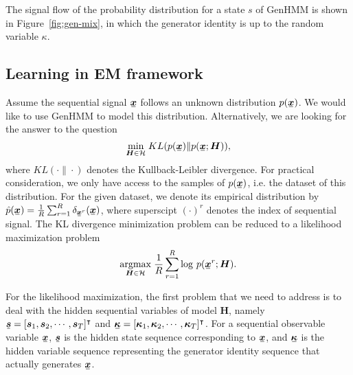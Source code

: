 \documentclass[letterpaper]{article} %
\newcommand{\ubar}[1]{\mkern2mu\underline{\mkern-2mu #1\mkern-2mu}\mkern2mu}
\newcommand{\ubm}[1]{\ubar{\bm{#1}}}
\newcommand{\ubmr}[2]{\ubar{\bm{#1}}^{#2}}
\begin{document}
The signal flow of the probability distribution for a state $s$ of GenHMM is shown in Figure~\ref{fig:gen-mix}, in which the generator identity is up to the random variable $\kappa$.

\subsection{Learning in EM framework}

Assume the sequential signal $\ubm{x}$ follows an unknown distribution $p(\ubm{x})$. We would like to use GenHMM to model this distribution. Alternatively, we are looking for the answer to the question
\begin{equation}
  \umin{\bm{H}\in \Hh} KL({p}(\ubm{x})\| p(\ubm{x};\bm{H})),
\end{equation}
where $KL(\cdot\|\cdot)$ denotes the Kullback-Leibler divergence. For practical consideration, we only have access to the samples of $p(\ubm{x})$, i.e. the dataset of this distribution. For the given dataset, we denote its empirical distribution by $\hat{p}(\ubm{x}) = \frac{1}{R}\sum_{r=1}^{R} \delta_{\ubmr{x}{r}}(\ubm{x})$, where superscipt $(\cdot)^{r}$ denotes the index of sequential signal. 
The KL divergence minimization problem can be reduced to a likelihood maximization problem
\begin{equation}\label{eq:ml-of-hmm}
  \uargmax{\bm{H} \in \Hh} \frac{1}{R}\sum_{r=1}^{R}\log\,p(\ubmr{x}{r}; \bm{H}).
\end{equation}

For the likelihood maximization, the first problem that we need to address is to deal with the hidden sequential variables of model $\bm{H}$, namely $\ubm{s}=[ \bm{s}_1, \bm{s}_2, \cdots, \bm{s}_T ]^{\intercal}$ and $\ubm{\kappa} = [\bm{\kappa}_1, \bm{\kappa}_2, \cdots, \bm{\kappa}_T]^{\intercal}$. For a sequential observable variable $\ubm{x}$, $\ubm{s}$ is the hidden state sequence corresponding to $\ubm{x}$, and $\ubm{\kappa}$ is the hidden variable sequence representing the generator identity sequence that actually generates $\ubm{x}$.
\end{document}
